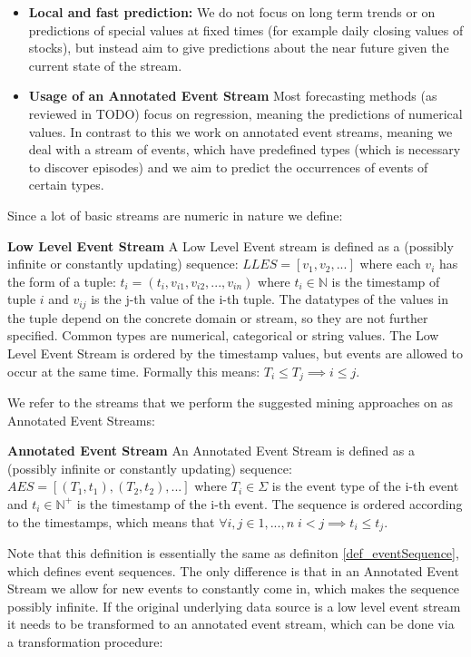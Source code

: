 \begin{itemize}
	\item \textbf{Local and fast prediction:} We do not focus on long term trends or on predictions of special values at fixed times (for example daily closing values of stocks), but instead aim to give predictions about the near future given the current state of the stream.
	\item \textbf{Usage of an Annotated Event Stream} Most forecasting methods (as reviewed in TODO) focus on regression, meaning the predictions of numerical values. In contrast to this we work on annotated event streams, meaning we deal with a stream of events, which have predefined types (which is necessary to discover episodes) and we aim to predict the occurrences of events of certain types.
\end{itemize}

Since a lot of basic streams are numeric in nature we define:

\begin{mydef}
\textbf{Low Level Event Stream} A Low Level Event stream is defined as a (possibly infinite or constantly updating) sequence: $LLES = [v_1,v_2,...]$ where each $v_i$ has the form of a tuple: $t_i = (t_i,v_{i1},v_{i2},...,v_{in})$ where $t_i \in \mathbb{N}$ is the timestamp of tuple $i$ and $v_{ij}$ is the j-th value of the i-th tuple. The datatypes of the values in the tuple depend on the concrete domain or stream, so they are not further specified. Common types are numerical, categorical or string values. The Low Level Event Stream is ordered by the timestamp values, but events are allowed to occur at the same time. Formally this means: $T_i \leq T_j \implies i \leq j$. 
\end{mydef}

We refer to the streams that we perform the suggested mining approaches on as Annotated Event Streams:

\begin{mydef}
\textbf{Annotated Event Stream} An Annotated Event Stream is defined as a (possibly infinite or constantly updating) sequence: $AES = [ (T_1,t_1),(T_2,t_2),... ] $ where $T_i \in \Sigma$ is the event type of the i-th event and $t_i \in \mathbb{N}^+$ is the timestamp of the i-th event. The sequence is ordered according to the timestamps, which means that $\forall i,j \in {1,...,n} \; i<j \implies t_i \leq t_j$.
\end{mydef}

Note that this definition is essentially the same as definiton \ref{def_eventSequence}, which defines event sequences. The only difference is that in an Annotated Event Stream we allow for new events to constantly come in, which makes the sequence possibly infinite.
If the original underlying data source is a low level event stream it needs to be transformed to an annotated event stream, which can be done via a transformation procedure:

